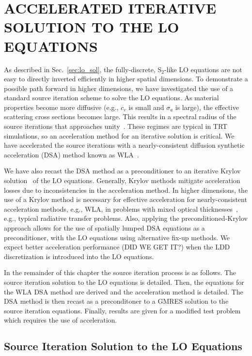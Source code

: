 
\chapter{\uppercase {Accelerated Iterative Solution to the LO Equations}}

As described in Sec.~\ref{sec:lo_sol}, the fully-discrete, S$_2$-like LO equations
are not easy to directly inverted efficiently in higher spatial dimensions.  
To demonstrate a possible path forward in
higher dimensions, we have investigated the use of a standard
source iteration scheme to solve the LO equations.  As
material properties become more diffusive (e.g., $c_v$ is small and $\sigma_a$ is
large), the effective scattering cross sections becomes large.  This results in a spectral radius of the source iterations that approaches
unity~\cite{morel_ldtrt}.  These regimes are typical in TRT simulations, so an
acceleration method for an iterative solution is critical. 
We have accelerated the source iterations with a nearly-consistent diffusion synthetic acceleration
(DSA) method known as WLA~\cite{wla,wla_thesis}.

We have also recast the DSA method as a preconditioner to an iterative
Krylov solution~\cite{larson_morel_sn} of the LO equations.  Generally, Krylov
methods mitigate acceleration losses due to inconsistencies in the acceleration
method.  In higher dimensions, the use of a Krylov method is necessary for effective
acceleration for nearly-consistent acceleration methods, e.g., WLA, in problems with
mixed optical thicknesses~\cite{larson_morel_sn}, e.g., typical radiative transfer
problems.  Also, applying the preconditioned-Krylov approach allows for the use of
spatially lumped DSA  equations as a preconditioner, with the LO equations using
alternative fix-up methods.  We expect better acceleration performance (DID WE GET IT?) when the
LDD discretization is introduced into the LO equations. 

In the remainder of this chapter the source iteration process is as follows.  The source
iteration solution to the LO equations is detailed.  Then, the equations for the WLA DSA
method are derived and the acceleration method is detailed.  The DSA method is then recast
as a preconditoner to a GMRES solution to the source iteration equations.  Finally,
results are given for a modified test problem which requires the use of acceleration.

\section{Source Iteration Solution to the LO Equations}

